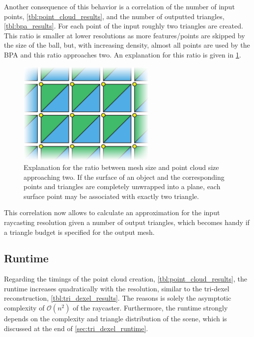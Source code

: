 Another consequence of this behavior is a correlation of the number of input points, \cf \cref{tbl:point_cloud_results}, and the number of outputted triangles, \cf \cref{tbl:bpa_results}.
For each point of the input roughly two triangles are created.
This ratio is smaller at lower resolutions as more features/points are skipped by the size of the ball, but, with increasing density, almost all points are used by the BPA and this ratio approaches two.
An explanation for this ratio is given in \cref{fig:bpa_point_triangle_ratio}.
%
\begin{figure}
	\centering
	\includegraphics[width=0.6\textwidth]{images/bpa_point_triangle_ratio}
	\caption[BPA point to triangle ratio]{
		Explanation for the ratio between mesh size and point cloud size approaching two.
		If the surface of an object and the corresponding points and triangles are completely unwrapped into a plane, each surface point may be associated with exactly two triangle.
	}
	\label{fig:bpa_point_triangle_ratio}
\end{figure}
%
This correlation now allows to calculate an approximation for the input raycasting resolution given a number of output triangles, which becomes handy if a triangle budget is specified for the output mesh.


\subsection{Runtime}

Regarding the timings of the point cloud creation, \cf \cref{tbl:point_cloud_results}, the runtime increases quadratically with the resolution, similar to the tri-dexel reconstruction, \cf \cref{tbl:tri_dexel_results}.
The reasons is solely the asymptotic complexity of $\mathcal{O}(n^2)$ of the raycaster.
Furthermore, the runtime strongly depends on the complexity and triangle distribution of the scene, which is discussed at the end of \cref{sec:tri_dexel_runtime}.

